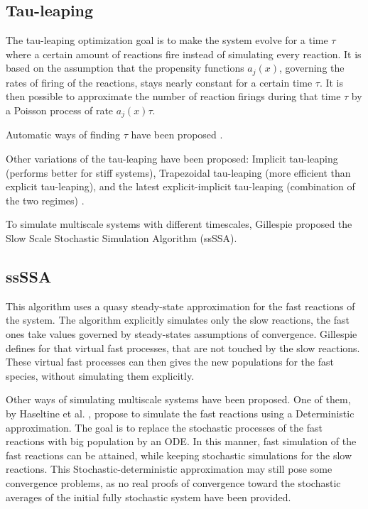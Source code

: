 \documentclass[letterpaper, oneside]{article}
\begin{document}
\subsection{Tau-leaping} %
\label{sub:tau_leaping}
The tau-leaping optimization goal is to make the system evolve for a time $\tau$ where a certain amount of reactions fire instead of simulating every reaction. It is based on the assumption that the propensity functions $a_j(x)$, governing the rates of firing of the reactions, stays nearly constant for a certain time $\tau$. It is then possible to approximate the number of reaction firings during that time $\tau$ by a Poisson process of rate $a_j(x) \tau$.

Automatic ways of finding $\tau$ have been proposed \cite{Cao:2006p6200}.

Other variations of the tau-leaping have been proposed: Implicit tau-leaping (performs better for stiff systems), Trapezoidal tau-leaping (more efficient than explicit tau-leaping), and the latest explicit-implicit tau-leaping (combination of the two regimes) \cite{Cao:2007p5660}.


To simulate multiscale systems with different timescales, Gillespie proposed the Slow Scale Stochastic Simulation Algorithm (ssSSA).

\subsection{ssSSA} %
\label{sub:ssssa}
This algorithm uses a quasy steady-state approximation for the fast reactions of the system. The algorithm explicitly simulates only the slow reactions, the fast ones take values governed by steady-states assumptions of convergence. Gillespie defines for that virtual fast processes, that are not touched by the slow reactions. These virtual fast processes can then gives the new populations for the fast species, without simulating them explicitly.

Other ways of simulating multiscale systems have been proposed. One of them, by Haseltine et al. \cite{Haseltine:2002p4632}, propose to simulate the fast reactions using a Deterministic approximation. The goal is to replace the stochastic processes of the fast reactions with big population by an ODE. In this manner, fast simulation of the fast reactions can be attained, while keeping stochastic simulations for the slow reactions. This Stochastic-deterministic approximation may still pose some convergence problems, as no real proofs of convergence toward the stochastic averages of the initial fully stochastic system have been provided.
\end{document}

